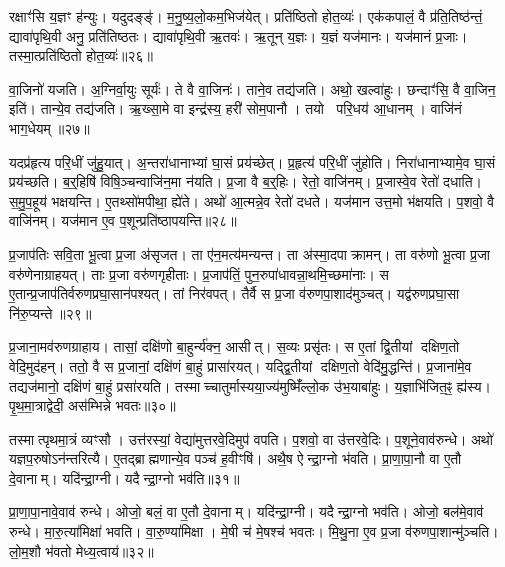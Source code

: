 रक्षाꣳ॑सि य॒ज्ञꣳ ह॑न्युः।
यदुदङ्ङ्॑।
म॒नु॒ष्य॒लो॒कम॒भिज॑येत्।
प्रति॑ष्ठितो होत॒व्यः॑।
एक॑कपालं॒ वै प्र॑ति॒तिष्ठ॑न्तं॒ द्यावा॑पृथि॒वी अनु॒ प्रति॑तिष्ठतः।
द्यावा॑पृथि॒वी ऋ॒तवः॑।
ऋ॒तून् य॒ज्ञः।
य॒ज्ञं यज॑मानः।
यज॑मानं प्र॒जाः।
तस्मा॒त्प्रति॑ष्ठितो होत॒व्यः॑॥२६॥

वा॒जिनो॑ यजति।
अ॒ग्निर्वा॒युः सूर्यः॑।
ते वै वा॒जिनः॑।
ताने॒व तद्य॑जति।
अथो॒ खल्वा॑हुः।
छन्दाꣳ॑सि॒ वै वा॒जिन॒ इति॑।
तान्ये॒व तद्य॑जति।
ऋ॒ख्सा॒मे वा इन्द्र॑स्य॒ हरी॑ सोम॒पानौ।
तयो परि॒धय॑ आ॒धानम्।
वाजि॑नं भाग॒धेयम्॥२७॥

यदप्र॑हृत्य परि॒धीं जु॑हु॒यात्।
अ॒न्तरा॑धानाभ्यां घा॒सं प्रय॑च्छेत्।
प्र॒हृत्य॑ परि॒धीं जु॑होति।
निरा॑धानाभ्यामे॒व घा॒सं प्रय॑च्छति।
ब॒र्॒हिषि॑ विषि॒ञ्चन्वाजि॑न॒मा न॑यति।
प्र॒जा वै ब॒र्॒हिः।
रेतो॒ वाजि॑नम्।
प्र॒जास्वे॒व रेतो॑ दधाति।
स॒मु॒प॒हूय॑ भक्षयन्ति।
ए॒तथ्सो॑मपीथा॒ ह्ये॑ते।
अथो॑ आ॒त्मन्ने॒व रेतो॑ दधते।
यज॑मान उत्त॒मो भ॑क्षयति।
प॒शवो॒ वै वाजि॑नम्।
यज॑मान ए॒व प॒शून्प्रति॑ष्ठापयन्ति॥२८॥\anuvakamend[लो॒को ब॑हुरू॒पं भ॑व॒त्याज्य॑भागौ प॒शव॒ आज्य॑मव॒द्येदा॑हव॒नीयः॑ प्र॒त्यक्तस्मा॒त्प्रति॑ष्ठितो होत॒व्यो॑ भाग॒धेय॑मे॒ते च॒त्वारि॑ च]

प्र॒जाप॑तिः सवि॒ता भू॒त्वा प्र॒जा अ॑सृजत।
ता ए॑न॒मत्य॑मन्यन्त।
ता अ॑स्मा॒दपाक्रामन्।
ता वरु॑णो भू॒त्वा प्र॒जा वरु॑णेनाग्राहयत्।
ताः प्र॒जा वरु॑णगृहीताः।
प्र॒जाप॑तिं॒ पुन॒रुपा॑धावन्ना॒थमि॒च्छमा॑नाः।
स ए॒तान्प्र॒जाप॑तिर्वरुण\-प्रघा॒सान॑पश्यत्।
तां निर॑वपत्।
तैर्वै स प्र॒जा व॑रुणपा॒शाद॑मुञ्चत्।
यद्व॑रुणप्रघा॒सा नि॑रु॒प्यन्ते॥२९॥

प्र॒जाना॒मव॑रुणग्राहाय।
तासां॒ दक्षि॑णो बा॒हुर्न्य॑क्न॒ आसीत्।
स॒व्यः प्रसृ॑तः।
स ए॒तां द्वि॒तीयां दक्षिण॒तो वेदि॒मुद॑हन्।
ततो॒ वै स प्र॒जानां॒ दक्षि॑णं बा॒हुं प्रासा॑रयत्।
यद्द्वि॒तीयां दक्षिण॒तो वेदि॑मु॒द्धन्ति॑।
प्र॒जाना॑मे॒व तद्यज॑मानो॒ दक्षि॑णं बा॒हुं प्रसा॑रयति।
तस्माच्चातुर्मास्यया॒ज्य॑मुष्मिँ॑ल्लो॒क उ॑भ॒याबा॑हुः।
य॒ज्ञाभि॑जित॒ꣴ॒ ह्य॑स्य।
पृ॒थ॒मा॒त्राद्वेदी॒ अस॑म्भिन्ने भवतः॥३०॥

तस्मात्पृथमा॒त्रं व्यꣳसौ।
उत्त॑रस्यां॒ वेद्या॑मुत्तरवे॒दिमुप॑ वपति।
प॒शवो॒ वा उ॑त्तरवे॒दिः।
प॒शूने॒वाव॑रुन्धे।
अथो॑ यज्ञप॒रुषो\-ऽन॑न्तरित्यै।
ए॒तद्ब्राह्मणान्ये॒व पञ्च॑ ह॒वीꣳषि॑।
अथै॒ष ऐन्द्रा॒ग्नो भ॑वति।
प्रा॒णा॒पा॒नौ वा ए॒तौ दे॒वानाम्।
यदि॑न्द्रा॒ग्नी।
यदैन्द्रा॒ग्नो भव॑ति॥३१॥

प्रा॒णा॒पा॒नावे॒वाव॑ रुन्धे।
ओजो॒ बलं॒ वा ए॒तौ दे॒वानाम्।
यदि॑न्द्रा॒ग्नी।
यदैन्द्रा॒ग्नो भव॑ति।
ओजो॒ बल॑मे॒वाव॑ रुन्धे।
मा॒रु॒त्या॑मिक्षा॑ भवति।
वा॒रु॒ण्या॑मिक्षा।
मे॒षी च॑ मे॒षश्च॑ भवतः।
मि॒थु॒ना ए॒व प्र॒जा व॑रुणपा॒शान्मु॑ञ्चति।
लो॒म॒शौ भ॑वतो मेध्य॒त्वाय॑॥३२॥

